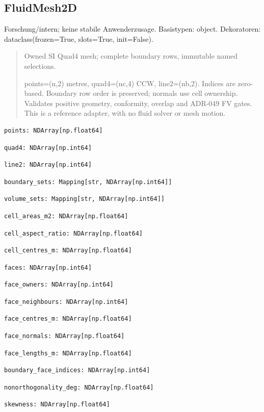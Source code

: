 \subsection{FluidMesh2D}
Forschung/intern; keine stabile Anwenderzusage.
Basistypen: object. Dekoratoren: dataclass(frozen=True, slots=True, init=False).
\begin{quote}
Owned SI Quad4 mesh; complete boundary rows, immutable named selections.\par points=(n,2) metres, quad4=(nc,4) CCW, line2=(nb,2). Indices are zero-based. Boundary row order is preserved; normals use cell ownership. Validates positive geometry, conformity, overlap and ADR-049 FV gates. This is a reference adapter, with no fluid solver or mesh motion.
\end{quote}
\begin{lstlisting}
points: NDArray[np.float64]
\end{lstlisting}
\begin{lstlisting}
quad4: NDArray[np.int64]
\end{lstlisting}
\begin{lstlisting}
line2: NDArray[np.int64]
\end{lstlisting}
\begin{lstlisting}
boundary_sets: Mapping[str, NDArray[np.int64]]
\end{lstlisting}
\begin{lstlisting}
volume_sets: Mapping[str, NDArray[np.int64]]
\end{lstlisting}
\begin{lstlisting}
cell_areas_m2: NDArray[np.float64]
\end{lstlisting}
\begin{lstlisting}
cell_aspect_ratio: NDArray[np.float64]
\end{lstlisting}
\begin{lstlisting}
cell_centres_m: NDArray[np.float64]
\end{lstlisting}
\begin{lstlisting}
faces: NDArray[np.int64]
\end{lstlisting}
\begin{lstlisting}
face_owners: NDArray[np.int64]
\end{lstlisting}
\begin{lstlisting}
face_neighbours: NDArray[np.int64]
\end{lstlisting}
\begin{lstlisting}
face_centres_m: NDArray[np.float64]
\end{lstlisting}
\begin{lstlisting}
face_normals: NDArray[np.float64]
\end{lstlisting}
\begin{lstlisting}
face_lengths_m: NDArray[np.float64]
\end{lstlisting}
\begin{lstlisting}
boundary_face_indices: NDArray[np.int64]
\end{lstlisting}
\begin{lstlisting}
nonorthogonality_deg: NDArray[np.float64]
\end{lstlisting}
\begin{lstlisting}
skewness: NDArray[np.float64]
\end{lstlisting}
